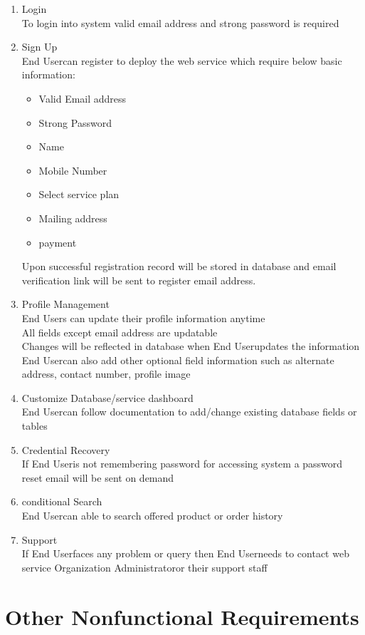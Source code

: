 \documentclass{scrreprt}
\newcommand*\arrow{\item[$\Rightarrow$]}
\def\admin{Organization Administrator}
\def\user{End User}
\begin{document}
\begin{enumerate}[start=1,label={\bfseries REQ \arabic*:}]
	\addtolength{\itemindent}{40pt}
	\item Login
		\\To login into system valid email address and strong password is required
	\item Sign Up
		\\ \user \space can register to deploy the web service which require below basic information:
			\begin{itemize}
				\arrow Valid Email address
				\arrow Strong Password
				\arrow Name
				\arrow Mobile Number
				\arrow Select service plan
				\arrow Mailing address
				\arrow payment
			\end{itemize}
		Upon successful registration record will be stored in database and email verification link will be sent to register email address.
	\item Profile Management
		\\ \user s can update their profile information anytime
		\\All fields except email address are updatable
		\\Changes will be reflected in database when \user \space updates the information
		\\ \user can also add other optional field information such as alternate address, contact number, profile image
	\item Customize Database/service dashboard
		\\ \user \space can follow documentation to add/change existing database fields or tables
	\item Credential Recovery
		\\If \user \space is not remembering password for accessing system a password reset email will be sent on demand
	\item conditional Search
		\\ \user \space can able to search offered product or order history
	\item Support
		\\If \user \space faces any problem or query then \user \space needs to contact web service \admin \space or their support staff
\end{enumerate}

\chapter{Other Nonfunctional Requirements}
\end{document}
